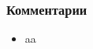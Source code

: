  
 
 
 
 
\clearpage
\subsubsection{Комментарии}
\label{sec:18_06_2020.fb.zharkih_ekaterina.1.mova_jazyk.cmt}

\begin{itemize}
\item aa

\end{itemize}



